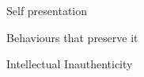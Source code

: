 \documentclass[aspectratio=169]{beamer}
\begin{document}
\begin{frame}
  \begin{center}
    \Huge Self presentation
    \\ \small \cite{sakulku11}
  \end{center}
\end{frame}

\begin{frame}
  \begin{center}
    \Huge Behaviours that preserve it
  \end{center}
\end{frame}

\begin{frame}
  \begin{center}
    \Huge Intellectual Inauthenticity
    \\ \small \cite{clanceimes78}
  \end{center}
\end{frame}
\end{document}
